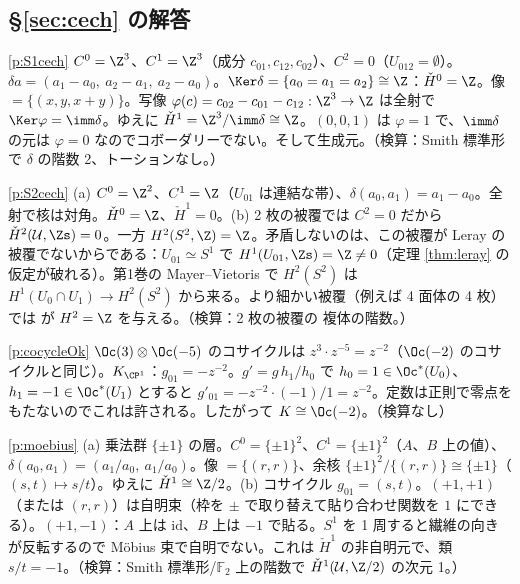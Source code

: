 \subsection*{§\ref{sec:cech} の解答}
\begin{sol}{\ref{p:S1cech}}
$C^0=\Z^3$、$C^1=\Z^3$（成分 $c_{01},c_{12},c_{02}$）、$C^2=0$（$U_{012}=\emptyset$）。$\delta a=(a_1-a_0,\ a_2-a_1,\ a_2-a_0)$。$\Ker\delta=\{a_0=a_1=a_2\}\cong\Z$：$\check H^0=\Z$。像 $=\{(x,y,x+y)\}$。写像 $\varphi(c)=c_{02}-c_{01}-c_{12}:\Z^3\to\Z$ は全射で $\Ker\varphi=\imm\delta$。ゆえに $\check H^1=\Z^3/\imm\delta\cong\Z$。$(0,0,1)$ は $\varphi=1$ で、$\imm\delta$ の元は $\varphi=0$ なのでコボーダリーでない。そして生成元。（検算：Smith 標準形で $\delta$ の階数 2、トーションなし。）
\end{sol}
\begin{sol}{\ref{p:S2cech}}
(a) $C^0=\Z^2$、$C^1=\Z$（$U_{01}$ は連結な帯）、$\delta(a_0,a_1)=a_1-a_0$。全射で核は対角。$\check H^0=\Z$、$\check H^1=0$。(b) 2 枚の被覆では $C^2=0$ だから $\check H^2(\mathcal U,\Zs)=0$。一方 $H^2(S^2,\Z)=\Z$。矛盾しないのは、この被覆が Leray の被覆でないからである：$U_{01}\simeq S^1$ で $H^1(U_{01},\Zs)=\Z\ne0$（定理 \ref{thm:leray} の仮定が破れる）。第1巻の Mayer--Vietoris で $H^2(S^2)$ は $H^1(U_0\cap U_1)\to H^2(S^2)$ から来る。より細かい被覆（例えば 4 面体の 4 枚）では \Cech{} が $H^2=\Z$ を与える。（検算：2 枚の被覆の \Cech{} 複体の階数。）
\end{sol}
\begin{sol}{\ref{p:cocycleOk}}
$\Oc(3)\otimes\Oc(-5)$ のコサイクルは $z^3\cdot z^{-5}=z^{-2}$（$\Oc(-2)$ のコサイクルと同じ）。$K_{\CP^1}$：$g_{01}=-z^{-2}$。$g'=g\,h_1/h_0$ で $h_0=1\in\Oc^*(U_0)$、$h_1=-1\in\Oc^*(U_1)$ とすると $g'_{01}=-z^{-2}\cdot(-1)/1=z^{-2}$。定数は正則で零点をもたないのでこれは許される。したがって $K\cong\Oc(-2)$。（検算なし）
\end{sol}
\begin{sol}{\ref{p:moebius}}
(a) 乗法群 $\{\pm1\}$ の層。$C^0=\{\pm1\}^2$、$C^1=\{\pm1\}^2$（$A$、$B$ 上の値）、$\delta(a_0,a_1)=(a_1/a_0,\ a_1/a_0)$。像 $=\{(r,r)\}$、余核 $\{\pm1\}^2/\{(r,r)\}\cong\{\pm1\}$（$(s,t)\mapsto s/t$）。ゆえに $\check H^1\cong\Z/2$。(b) コサイクル $g_{01}=(s,t)$。$(+1,+1)$（または $(r,r)$）は自明束（枠を $\pm$ で取り替えて貼り合わせ関数を $1$ にできる）。$(+1,-1)$：$A$ 上は $\mathrm{id}$、$B$ 上は $-1$ で貼る。$S^1$ を 1 周すると繊維の向きが反転するので Möbius 束で自明でない。これは $\check H^1$ の非自明元で、類 $s/t=-1$。（検算：Smith 標準形/$\mathbb F_2$ 上の階数で $\check H^1(\mathcal U,\Z/2)$ の次元 1。）
\end{sol}
